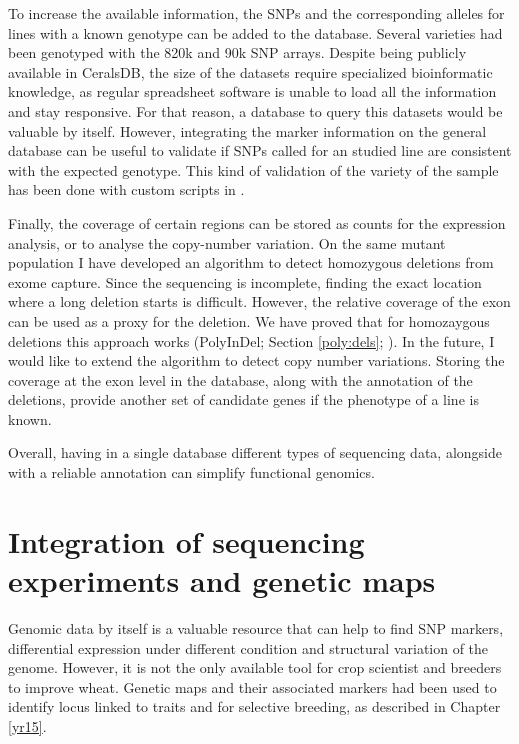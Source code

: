 To increase the available information, the SNPs and the corresponding alleles for lines with a known genotype  can be added to the database. 
Several varieties had been genotyped with the 820k \citep{Winfield2016} and 90k \citep{Wang2014} SNP arrays. 
Despite being publicly available in CeralsDB, the size of the datasets require specialized bioinformatic knowledge, as regular spreadsheet software is unable to load all the information and stay responsive. 
For that reason, a database to query this datasets would be valuable by itself. 
However, integrating the marker information on the general database can be useful to validate if SNPs called for an studied line are consistent with the expected genotype. 
This kind of validation of the variety of the sample has been done with custom scripts in \citep{Hubbard2015}.

Finally, the coverage of certain regions can be stored as counts for the expression analysis, or to analyse the copy-number variation. 
On the same mutant population I have developed an algorithm to detect homozygous deletions from exome capture. 
Since the sequencing is incomplete, finding the exact location where a long deletion starts is difficult. 
However, the relative coverage of the exon can be used as a proxy for the deletion. 
We have proved that for homozaygous deletions this approach works (PolyInDel; Section \ref{poly:dels}; \citealt{Krasileva2016}). 
In the future, I would like to extend the algorithm to detect copy number variations. 
Storing the coverage at the exon level in the database, along with the annotation of the deletions, provide another set of candidate genes if the phenotype of a line is known. 

Overall, having in a single database different types of sequencing data, alongside with a reliable annotation can simplify functional genomics. 


\section{Integration of sequencing experiments and genetic maps}
Genomic data by itself is a valuable resource that can help to find SNP markers, differential expression under different condition and structural variation of the genome. 
However, it is not the only available tool for crop scientist and breeders to improve wheat. 
Genetic maps and their associated markers had been used to identify locus linked to traits and for selective breeding, as described in Chapter \ref{yr15}. 

